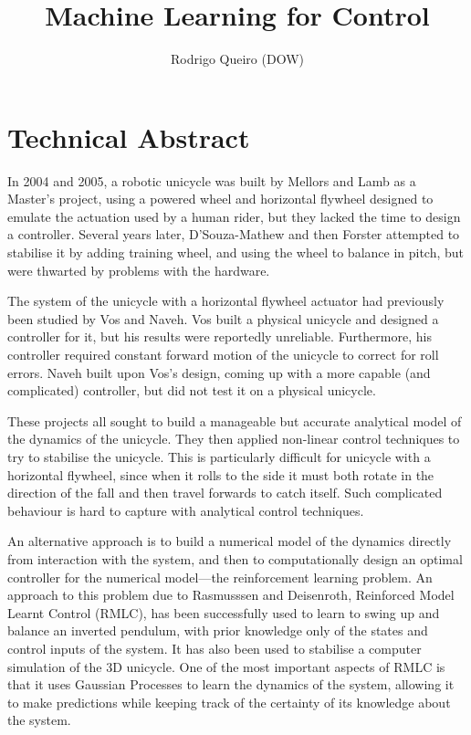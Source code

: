\documentclass{IIBproject}
\begin{document}
\author{Rodrigo Queiro (DOW)}
\title{Machine Learning for Control}
\maketitle
\thispagestyle{empty}

\pagestyle{plain}
\tableofcontents
\newpage

\setlength{\parskip}{6pt plus 1pt minus 1pt}

\section*{Technical Abstract}

In 2004 and 2005, a robotic unicycle was built by
Mellors\cite{ref:mellors} and
Lamb\cite{ref:Lamb} as a Master's project, using a powered wheel and horizontal flywheel
designed to emulate the actuation used by a human rider, but they lacked the
time to design a controller. Several years later, D'Souza-Mathew\cite{ref:dsm}
and then Forster\cite{ref:forster} attempted to stabilise it by adding
training wheel, and using the wheel to balance in pitch, but were thwarted by
problems with the hardware.

The system of the unicycle with a horizontal flywheel actuator had previously
been studied by Vos\cite{ref:vos} and Naveh\cite{ref:naveh}. Vos built a
physical unicycle and designed a controller for it, but his results were
reportedly unreliable. Furthermore, his controller required constant forward
motion of the unicycle to correct for roll errors. Naveh built upon Vos's
design, coming up with a more capable (and complicated) controller, but did
not test it on a physical unicycle. 

These projects all sought to build a manageable but accurate analytical
model of the dynamics of the unicycle. They then applied non-linear control
techniques to try to stabilise the unicycle. This is particularly difficult
for unicycle with a horizontal flywheel, since when it rolls to the side it
must both rotate in the direction of the fall and then travel forwards to
catch itself. Such complicated behaviour is hard to capture with analytical
control techniques.

An alternative approach is to build a numerical model of the dynamics directly
from interaction with the system, and then to computationally design an
optimal controller for the numerical model---the reinforcement learning
problem. An approach to this problem due to Rasmusssen and
Deisenroth\cite{ref:rasdei08}, Reinforced Model Learnt Control (RMLC), has
been successfully used to learn to swing up and balance an inverted pendulum,
with prior knowledge only of the states and control inputs of the system. It
has also been used to stabilise a computer simulation of the 3D unicycle. One
of the most important aspects of RMLC is that it uses Gaussian Processes to
learn the dynamics of the system, allowing it to make predictions while
keeping track of the certainty of its knowledge about the system.
\end{document}
